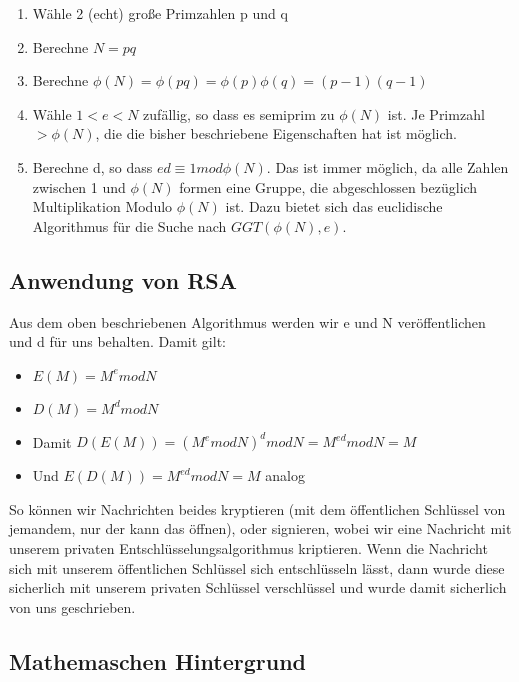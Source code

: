 \documentclass[12pt,a4paper]{article}
\theoremstyle{definition}
\begin{document}
    \begin{enumerate}
        \item Wähle 2 (echt) große Primzahlen p und q
        \item Berechne $N = pq$
        \item Berechne $\phi(N) = \phi(pq) = \phi(p) \phi(q) = (p-1)(q-1)$
        \item Wähle $1 < e < N$ zufällig, so dass es semiprim zu $\phi(N)$ ist. Je Primzahl $> \phi(N)$, die die
            bisher beschriebene Eigenschaften hat ist möglich.
        \item Berechne d, so dass $ed \equiv 1 mod \phi(N)$. Das ist immer möglich, da alle Zahlen zwischen 1 und
            $\phi(N)$ formen eine Gruppe, die abgeschlossen bezüglich Multiplikation Modulo $\phi(N)$ ist.
            Dazu bietet sich das euclidische Algorithmus für die Suche nach $GGT(\phi(N), e)$.
    \end{enumerate}

    \subsection{Anwendung von RSA}

    Aus dem oben beschriebenen Algorithmus werden wir e und N veröffentlichen und d für uns behalten. Damit gilt:

    \begin{itemize}
        \item $E(M) = M^e mod N$
        \item $D(M) = M^d mod N$
        \item Damit $D(E(M)) = (M^e mod N)^d mod N = M^{ed} mod N = M$
        \item Und $E(D(M)) = M^{ed} mod N = M$ analog
    \end{itemize}

    So können wir Nachrichten beides kryptieren (mit dem öffentlichen Schlüssel von jemandem, nur der kann das öffnen),
    oder signieren, wobei wir eine Nachricht mit unserem privaten Entschlüsselungsalgorithmus kriptieren. Wenn die
    Nachricht sich mit unserem öffentlichen Schlüssel sich entschlüsseln lässt, dann wurde diese sicherlich mit unserem
    privaten Schlüssel verschlüssel und wurde damit sicherlich von uns geschrieben.

    \subsection{Mathemaschen Hintergrund}
\end{document}

